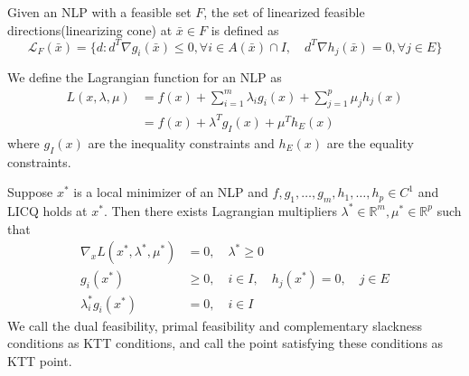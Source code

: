 \begin{definition}
    Given an NLP with a feasible set $F$, the set of linearized feasible directions(linearizing cone) at $\bar x \in F$ is defined as 
    $$\mathcal L_F(\bar x) = \{d: d^T \nabla g_i(\bar x) \leq 0, \forall i \in A(\bar x) \cap I, \quad d^T \nabla h_j(\bar x) = 0, \forall j \in E\}$$
\end{definition}
\begin{definition}
    We define the Lagrangian function for an NLP as 
    \begin{align*}
        L(x, \lambda, \mu) &= f(x) + \sum_{i=1}^m \lambda_i g_i(x) + \sum_{j=1}^p \mu_j h_j(x) \\
        &= f(x) + \lambda^T g_I(x) + \mu^T h_E(x)
    \end{align*}
    where $g_I(x)$ are the inequality constraints and $h_E(x)$ are the equality constraints.
\end{definition}
\begin{theorem}
    Suppose $x^*$ is a local minimizer of an NLP and $f,g_1,\ldots,g_m,h_1,\ldots,h_p \in C^1$ and LICQ holds at $x^*$. Then there exists Lagrangian multipliers $\lambda^* \in \mathbb R^m, \mu^* \in \mathbb R^p$ such that
    \begin{align*}
        \nabla_x L(x^*, \lambda^*, \mu^*) &= 0, \quad \lambda^* \geq 0 \tag*{Dual feasibility} \\
        g_i(x^*) &\geq 0, \quad i \in I, \quad h_j(x^*) = 0, \quad j \in E \tag*{Primal feasibility} \\
        \lambda^*_i g_i(x^*) &= 0, \quad i \in I \tag*{Complementary slackness}
    \end{align*}
    We call the dual feasibility, primal feasibility and complementary slackness conditions as KTT conditions, and call the point satisfying these conditions as KTT point.
\end{theorem}
